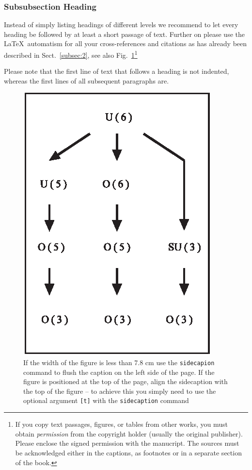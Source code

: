 \documentclass[graybox]{svmult}
\begin{document}
\subsubsection{Subsubsection Heading}
Instead of simply listing headings of different levels we recommend to
let every heading be followed by at least a short passage of text.
Further on please use the \LaTeX\ automatism for all your
cross-references and citations as has already been described in
Sect.~\ref{subsec:2}, see also Fig.~\ref{fig:1}\footnote{If you copy
text passages, figures, or tables from other works, you must obtain
\textit{permission} from the copyright holder (usually the original
publisher). Please enclose the signed permission with the manucript. The
sources must be acknowledged either in the
captions, as footnotes or in a separate section of the book.}

Please note that the first line of text that follows a heading is not indented, whereas the first lines of all subsequent paragraphs are.

%
\begin{figure}[b]
\sidecaption
\includegraphics[scale=.65]{figure}
%
%
\caption{If the width of the figure is less than 7.8 cm use the \texttt{sidecapion} command to flush the caption on the left side of the page. If the figure is positioned at the top of the page, align the sidecaption with the top of the figure -- to achieve this you simply need to use the optional argument \texttt{[t]} with the \texttt{sidecaption} command}
\label{fig:1}       %
\end{figure}
\end{document}
